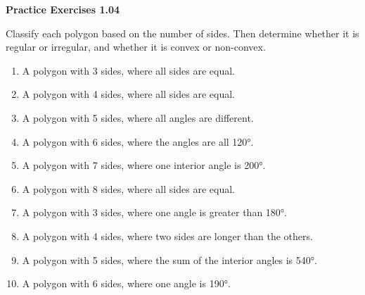 \vspace{0.3ex}
\noindent\textbf{Practice Exercises 1.04}

\vspace{0.2ex}

Classify each polygon based on the number of sides. Then determine whether it is regular or irregular, and whether it is convex or non-convex.
\begin{enumerate}
    \item A polygon with 3 sides, where all sides are equal.
    \item A polygon with 4 sides, where all sides are equal.
    \item A polygon with 5 sides, where all angles are different.
    \item A polygon with 6 sides, where the angles are all 120°.
    \item A polygon with 7 sides, where one interior angle is 200°.
    \item A polygon with 8 sides, where all sides are equal.
    \item A polygon with 3 sides, where one angle is greater than 180°.
    \item A polygon with 4 sides, where two sides are longer than the others.
    \item A polygon with 5 sides, where the sum of the interior angles is 540°.
    \item A polygon with 6 sides, where one angle is 190°.
\end{enumerate}
